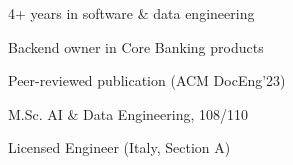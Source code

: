 \begin{sidelist}
  \item 4+ years in software \& data engineering
  \item Backend owner in Core Banking products
  \item Peer-reviewed publication (ACM DocEng'23)
  \item M.Sc. AI \& Data Engineering, 108/110
  \item Licensed Engineer (Italy, Section A)
\end{sidelist}
